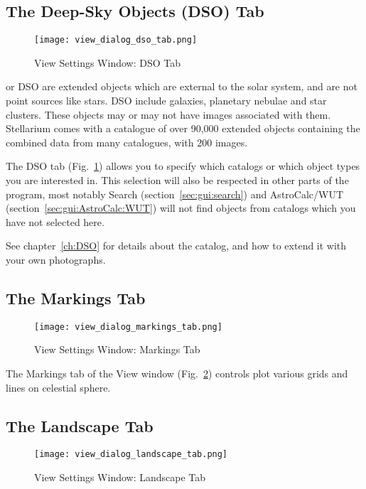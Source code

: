 \subsection{The Deep-Sky Objects (DSO) Tab}
\label{sec:gui:view:dso}

\begin{figure}[htbp]
\centering\texttt{[image: view\_dialog\_dso\_tab.png]}
\caption{View Settings Window: DSO Tab}
\label{fig:gui:view:dso}
\end{figure}

 or DSO are extended objects which are
external to the solar system, and are not point sources like stars.
DSO include galaxies, planetary nebulae and star clusters. These
objects may or may not have images associated with them. Stellarium
comes with a catalogue of over 90,000 extended objects containing
the combined data from many catalogues, with 200 images.  

The DSO tab (Fig.~\ref{fig:gui:view:dso}) allows you to specify which 
catalogs or which object types you are interested in. This selection 
will also be respected in other parts of the program, 
most notably Search (section~\ref{sec:gui:search}) and 
AstroCalc/WUT (section~\ref{sec:gui:AstroCalc:WUT}) 
will not find objects from catalogs which you have not selected here. 

See chapter~\ref{ch:DSO} for details about the catalog, 
and how to extend it with your own photographs.


\subsection{The Markings Tab}
\label{sec:gui:view:markings}

\begin{figure}[htbp]
\centering\texttt{[image: view\_dialog\_markings\_tab.png]}
\caption{View Settings Window: Markings Tab}
\label{fig:gui:view:markings}
\end{figure}

The Markings tab of the View window
(Fig.~\ref{fig:gui:view:markings}) controls plot various grids and lines on celestial sphere.

\subsection{The Landscape Tab}
\label{sec:gui:view:landscape}

\begin{figure}[htbp]
\centering\texttt{[image: view\_dialog\_landscape\_tab.png]}
\caption{View Settings Window: Landscape Tab}
\label{fig:gui:view:landscape}
\end{figure}

